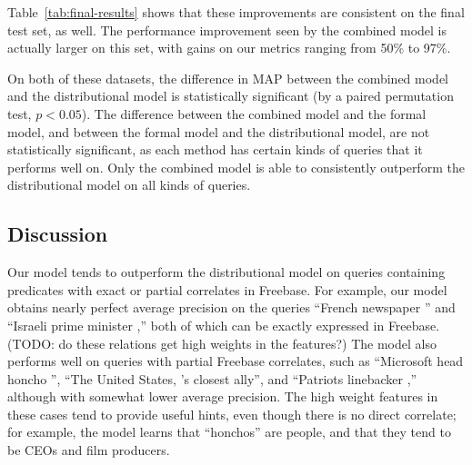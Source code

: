 \documentclass[11pt]{article}
\newcommand{\tabref}[1]{Table~\ref{tab:#1}}
\newcommand{\blank}{\underline{\hspace{.5cm}}}
\begin{document}
\tabref{final-results} shows that these improvements are consistent on
the final test set, as well.  The performance improvement seen by the
combined model is actually larger on this set, with gains on our
metrics ranging from 50\% to 97\%.

On both of these datasets, the difference in MAP between the combined
model and the distributional model is statistically significant (by a
paired permutation test, $p < 0.05$).  The difference between the
combined model and the formal model, and between the formal model and
the distributional model, are not statistically significant, as each
method has certain kinds of queries that it performs well on.  Only
the combined model is able to consistently outperform the
distributional model on all kinds of queries.

\subsection{Discussion}

Our model tends to outperform the distributional model on queries
containing predicates with exact or partial correlates in
Freebase. For example, our model obtains nearly perfect average
precision on the queries ``French newspaper \blank{}'' and ``Israeli
prime minister \blank{},'' both of which can be exactly expressed in
Freebase. (TODO: do these relations get high weights in the features?)
The model also performs well on queries with partial Freebase
correlates, such as ``Microsoft head honcho \blank{}'', ``The United
States, \blank{}'s closest ally'', and ``Patriots linebacker
\blank{},'' although with somewhat lower average precision. The high
weight features in these cases tend to provide useful hints, even
though there is no direct correlate; for example, the model learns
that ``honchos'' are people, and that they tend to be CEOs and film
producers.
\end{document}
